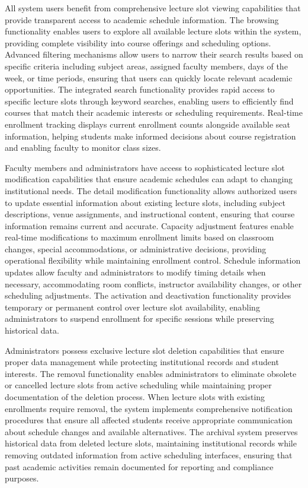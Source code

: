All system users benefit from comprehensive lecture slot viewing capabilities that provide transparent access to academic schedule information. The browsing functionality enables users to explore all available lecture slots within the system, providing complete visibility into course offerings and scheduling options. Advanced filtering mechanisms allow users to narrow their search results based on specific criteria including subject areas, assigned faculty members, days of the week, or time periods, ensuring that users can quickly locate relevant academic opportunities. The integrated search functionality provides rapid access to specific lecture slots through keyword searches, enabling users to efficiently find courses that match their academic interests or scheduling requirements. Real-time enrollment tracking displays current enrollment counts alongside available seat information, helping students make informed decisions about course registration and enabling faculty to monitor class sizes.

Faculty members and administrators have access to sophisticated lecture slot modification capabilities that ensure academic schedules can adapt to changing institutional needs. The detail modification functionality allows authorized users to update essential information about existing lecture slots, including subject descriptions, venue assignments, and instructional content, ensuring that course information remains current and accurate. Capacity adjustment features enable real-time modifications to maximum enrollment limits based on classroom changes, special accommodations, or administrative decisions, providing operational flexibility while maintaining enrollment control. Schedule information updates allow faculty and administrators to modify timing details when necessary, accommodating room conflicts, instructor availability changes, or other scheduling adjustments. The activation and deactivation functionality provides temporary or permanent control over lecture slot availability, enabling administrators to suspend enrollment for specific sessions while preserving historical data.

Administrators possess exclusive lecture slot deletion capabilities that ensure proper data management while protecting institutional records and student interests. The removal functionality enables administrators to eliminate obsolete or cancelled lecture slots from active scheduling while maintaining proper documentation of the deletion process. When lecture slots with existing enrollments require removal, the system implements comprehensive notification procedures that ensure all affected students receive appropriate communication about schedule changes and available alternatives. The archival system preserves historical data from deleted lecture slots, maintaining institutional records while removing outdated information from active scheduling interfaces, ensuring that past academic activities remain documented for reporting and compliance purposes.

